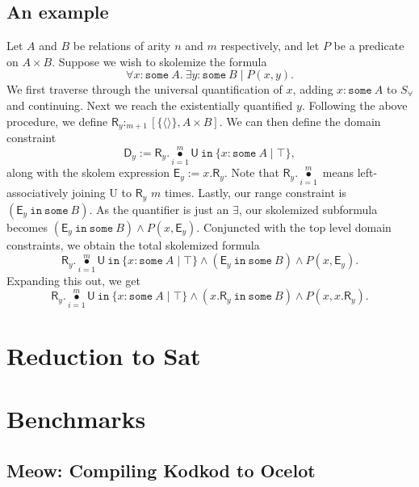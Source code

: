\documentclass{article}
\theoremstyle{definition}
\DeclareMathOperator{\bigdot}{\bullet}
\begin{document}
    \subsection{An example}
    Let $A$ and $B$ be relations of arity $n$ and $m$ respectively, and let $P$ be a predicate on $A\times B$. Suppose we wish to skolemize the formula
    \[\forall x : \texttt{some}\: A. \: \exists y : \texttt{some}\: B \mid P(x,y).\]
    We first traverse through the universal quantification of $x$, adding $x : \texttt{some}\: A$ to $S_\forall$ and continuing. Next we reach the existentially quantified $y$. Following the above procedure, we define $\textsf{R}_y :_{m + 1} [\{\langle \rangle\}, A\times B]$. We can then define the domain constraint
    \[\textsf{D}_y := \textsf{R}_y .\bigdot\limits_{i = 1}^m \textsf{U}~\texttt{in}~\{x : \texttt{some}\: A \mid \top\},\]
    along with the skolem expression $\textsf{E}_y := x.\textsf{R}_y$. Note that $\textsf{R}_y .\bigdot\limits_{i = 1}^m$ means left-associatively joining \textsf{U} to $\textsf{R}_y$ $m$ times. Lastly, our range constraint is $(\textsf{E}_y~\texttt{in}~\texttt{some}~B)$. As the quantifier is just an $\exists$, our skolemized subformula becomes $(\textsf{E}_y ~ \texttt{in}~\texttt{some}~B) \land P(x, \textsf{E}_y)$. Conjuncted with the top level domain constraints, we obtain the total skolemized formula
    \[\textsf{R}_y .\bigdot\limits_{i = 1}^m \textsf{U}~\texttt{in}~\{x : \texttt{some}\: A \mid \top\} \land (\textsf{E}_y ~ \texttt{in}~\texttt{some}~B) \land P(x, \textsf{E}_y).\]
    Expanding this out, we get
    \[\textsf{R}_y .\bigdot\limits_{i = 1}^m \textsf{U}~\texttt{in}~\{x : \texttt{some}\: A \mid \top\} \land (x.\textsf{R}_y ~ \texttt{in}~\texttt{some}~B) \land P(x, x.\textsf{R}_y).\]

    \section{Reduction to Sat}

    \section{Benchmarks}

    \subsection{Meow: Compiling Kodkod to Ocelot}
  
\end{document}
